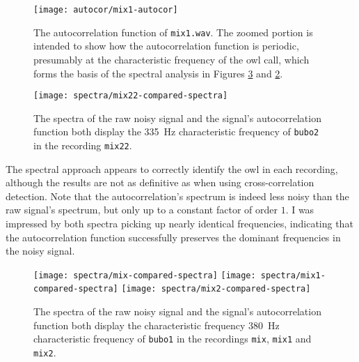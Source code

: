 \documentclass[11pt, a4paper]{article}
\begin{document}
\begin{figure}[htb!]
	\centering
	\texttt{[image: autocor/mix1-autocor]}  
	\caption{The autocorrelation function of \texttt{mix1.wav}. The zoomed portion is intended to show how the autocorrelation function is periodic, presumably at the characteristic frequency of the owl call, which forms the basis of the spectral analysis in Figures \ref{fft:fig:mix-spectra1} and \ref{fft:fig:mix-spectra2}.}
	\label{fft:fig:autocor-periodic}
\end{figure}
\begin{figure}[htb!]
	\centering
	\texttt{[image: spectra/mix22-compared-spectra]}  
	\caption{The spectra of the raw noisy signal and the signal's autocorrelation function both display the \SI{335}{\hertz} characteristic frequency of \texttt{bubo2} in the recording \texttt{mix22}.}
	\label{fft:fig:mix-spectra2}
\end{figure}


The spectral approach appears to correctly identify the owl in each recording, although the results are not as definitive as when using cross-correlation detection. Note that the autocorrelation's spectrum is indeed less noisy than the raw signal's spectrum, but only up to a constant factor of order $ 1 $. I was impressed by both spectra picking up nearly identical frequencies, indicating that the autocorrelation function successfully preserves the dominant frequencies in the noisy signal.


\begin{figure}[htb!]
	\centering
	\texttt{[image: spectra/mix-compared-spectra]}\vfill  
	\texttt{[image: spectra/mix1-compared-spectra]}\vfill  
	\texttt{[image: spectra/mix2-compared-spectra]}\vfill  
	\caption{The spectra of the raw noisy signal and the signal's autocorrelation function both display the characteristic frequency \SI{380}{\hertz} characteristic frequency of \texttt{bubo1} in the recordings \texttt{mix}, \texttt{mix1} and \texttt{mix2}.}
	\label{fft:fig:mix-spectra1}
\end{figure}
\end{document}
